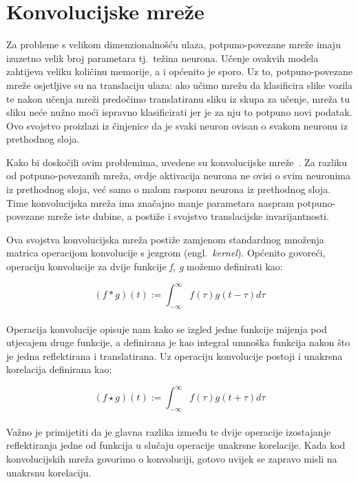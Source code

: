 \documentclass[times, utf8, zavrsni, numeric]{fer}
\begin{document}
\section{Konvolucijske mreže}
Za probleme s velikom dimenzionalnošću ulaza, potpuno-povezane mreže imaju izuzetno velik broj parametara tj.\ težina neurona. 
Učenje ovakvih modela zahtijeva veliku količinu memorije, a i općenito je sporo. 
Uz to, potpuno-povezane mreže osjetljive su na translaciju ulaza: ako učimo mrežu da klasificira slike vozila te nakon učenja mreži predočimo translatiranu sliku iz skupa za učenje, mreža tu sliku neće nužno moći ispravno klasificirati jer je za nju to potpuno novi podatak.
Ovo svojstvo proizlazi iz činjenice da je svaki neuron ovisan o svakom neuronu iz prethodnog sloja.

\pagebreak

Kako bi doskočili ovim problemima, uvedene su konvolucijske mreže~\cite{o2015introduction}. 
Za razliku od potpuno-povezanih mreža, ovdje aktivacija neurona ne ovisi o svim neuronima iz prethodnog sloja, već samo o malom rasponu neurona iz prethodnog sloja. 
Time konvolucijska mreža ima značajno manje parametara naspram potpuno-povezane mreže iste dubine, a postiže i svojstvo translacijske invarijantnosti.

Ova svojstva konvolucijska mreža postiže zamjenom standardnog množenja matrica operacijom konvolucije s jezgrom (engl.\ \textit{kernel}). 
Općenito govoreći, operaciju konvolucije za dvije funkcije \textit{f, g} možemo definirati kao:

\begin{equation}
    (f * g)(t) := \int_{-\infty}^{\infty}f(\tau)g(t-\tau)d\tau
    \label{eq:convolution}
\end{equation}
\\
Operacija konvolucije opisuje nam kako se izgled jedne funkcije mijenja pod utjecajem druge funkcije, 
a definirana je kao integral umnoška funkcija nakon što je jedna reflektirana i translatirana. 
Uz operaciju konvolucije postoji i unakrsna korelacija definirana kao:

\begin{equation}
    (f \star g)(t) := \int_{-\infty}^{\infty}f(\tau)g(t+\tau)d\tau
    \label{eq:convolution}
\end{equation}
\\
Važno je primijetiti da je glavna razlika između te dvije operacije izostajanje reflektiranja jedne od funkcija u slučaju operacije unakrsne korelacije. 
Kada kod konvolucijskih mreža govorimo o konvoluciji, gotovo uvijek se zapravo misli na unakrsnu korelaciju.
\end{document}
